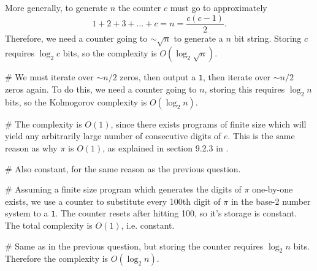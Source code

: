 \documentclass[12pt, a4paper]{article}
\begin{document}
{\begin{easylist}[enumerate]
More generally, to generate $n$ the counter $c$ must go to approximately 
\begin{equation*}
	1 + 2 + 3 + \dots + c = n = \frac{c(c-1)}{2}.
\end{equation*}
Therefore, we need a counter going to $\sim \sqrt{n}$ to generate a $n$ bit string.
Storing $c$ requires $\log_2 c$ bits, so the complexity is $O \left( \log_2 \sqrt{n} \right)$.

# We must iterate over $\sim n/2$ zeros, then output a \texttt{1}, then iterate over $\sim n/2$ zeros again.
To do this, we need a counter going to $n$, storing this requires $\log_2 n$ bits, so the Kolmogorov complexity is $O \left( \log_2 n \right)$.

# The complexity is $O(1)$, since there exists programs of finite size which will yield any arbitrarily large number of consecutive digits of $e$.
This is the same reason as why $\pi$ is $O(1)$, as explained in section 9.2.3 in \cite{duda_pattern_2000}.

# Also constant, for the same reason as the previous question.

# Assuming a finite size program which generates the digits of $\pi$ one-by-one exists, we use a counter to substitute every 100th digit of $\pi$ in the base-2 number system to a \texttt{1}.
The counter resets after hitting 100, so it's storage is constant.
The total complexity is $O(1)$, i.e. constant.

# Same as in the previous question, but storing the counter requires $\log_2 n$ bits.
 Therefore the complexity is $O \left( \log_2 n \right)$.
\end{easylist}


}
\end{document}
